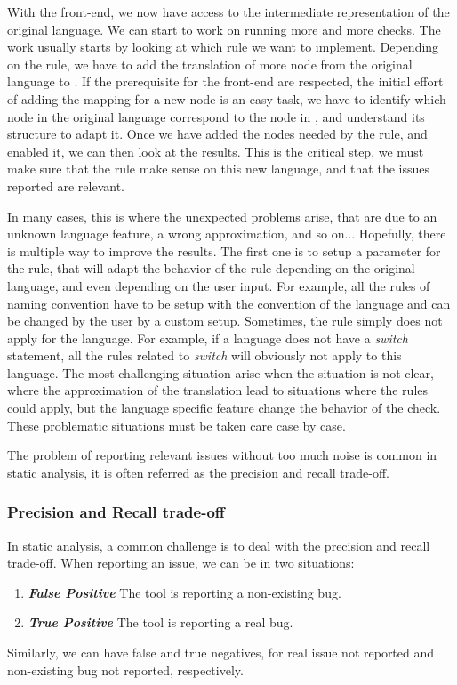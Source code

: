 With the front-end, we now have access to the intermediate representation of the original language. 
We can start to work on running more and more checks. 
The work usually starts by looking at which rule we want to implement. 
Depending on the rule, we have to add the translation of more node from the original language to \slang{}. 
If the prerequisite for the front-end are respected, the initial effort of adding the mapping for a new node is an easy task, we have to identify which node in the original language correspond to the node in \slang{}, and understand its structure to adapt it. 
Once we have added the nodes needed by the rule, and enabled it, we can then look at the results. 
This is the critical step, we must make sure that the rule make sense on this new language, and that the issues reported are relevant. 

In many cases, this is where the unexpected problems arise, that are due to an unknown language feature, a wrong approximation, and so on...
Hopefully, there is multiple way to improve the results. 
The first one is to setup a parameter for the rule, that will adapt the behavior of the rule depending on the original language, and even depending on the user input.
For example, all the rules of naming convention have to be setup with the convention of the language and can be changed by the user by a custom setup. 
Sometimes, the rule simply does not apply for the language. 
For example, if a language does not have a \emph{switch} statement, all the rules related to \emph{switch} will obviously not apply to this language.
The most challenging situation arise when the situation is not clear, where the approximation of the translation lead to situations where the rules could apply, but the language specific feature change the behavior of the check. 
These problematic situations must be taken care case by case.

The problem of reporting relevant issues without too much noise is common in static analysis, it is often referred as the precision and recall trade-off.

\subsubsection{Precision and Recall trade-off}
\label{subsubsec:precision_recall}

In static analysis, a common challenge is to deal with the precision and recall trade-off. When reporting an issue, we can be in two situations:

\begin{enumerate}
	\item \textbf{\textit{False Positive}} \newline The tool is reporting a non-existing bug.
	\item \textbf{\textit{True Positive}} \newline The tool is reporting a real bug. 
\end{enumerate}
Similarly, we can have false and true negatives, for real issue not reported and non-existing bug not reported, respectively. 

